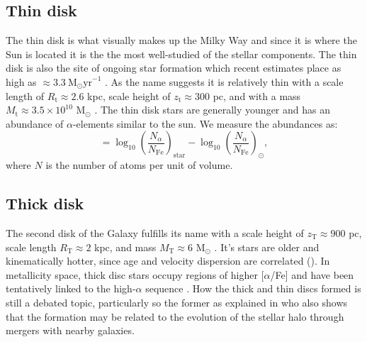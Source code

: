 \subsection{Thin disk}\label{subsec:components-thindisk}
The thin disk is what visually makes up the Milky Way and since it is where the Sun is located it is the the most well-studied of the stellar components. The thin disk is also the site of ongoing star formation which recent estimates place as high as $\approx 3.3\ \mathrm{M_\odot yr}^{-1}$ \citep{zari:22}. As the name suggests it is relatively thin with a scale length of $R_\mathrm{t} \approx 2.6$ kpc, scale height of $z_\mathrm{t} \approx 300$ pc, and with a mass $M_\mathrm{t} \approx 3.5\times 10^10$ M$_\odot$ \citep{bland-hawthorn:16}. The thin disk stars are generally younger and has an abundance of $\alpha$-elements similar to the sun. We measure the abundances as:
\begin{equation}
    [\alpha/\mathrm{Fe}] = \log_{10}\left(\frac{N_\alpha}{N_\mathrm{Fe}}\right)_\mathrm{star} - \log_{10}\left(\frac{N_\alpha}{N_\mathrm{Fe}}\right)_\odot,
\end{equation}
where $N$ is the number of atoms per unit of volume.

\subsection{Thick disk}\label{subsec:components-thickdisk}
The second disk of the Galaxy fulfills its name with a scale height of $z_\mathrm{T}\approx 900$ pc, scale length $R_\mathrm{T} \approx 2$ kpc, and mass $M_\mathrm{T} \approx 6$ M$_\odot$ \citep{bland-hawthorn:16}. It's stars are older \citep{martig:16} and kinematically hotter, since age and velocity dispersion are correlated (\citealt{martig:14,aumer:16}). In metallicity space, thick disc stars occupy regions of higher [$\alpha$/Fe] and have been tentatively linked to the high-$\alpha$ sequence \citep{katz:21}. How the thick and thin discs formed is still a debated topic, particularly so the former as explained in \cite{helmi:20} who also shows that the formation may be related to the evolution of the stellar halo through mergers with nearby galaxies. 

